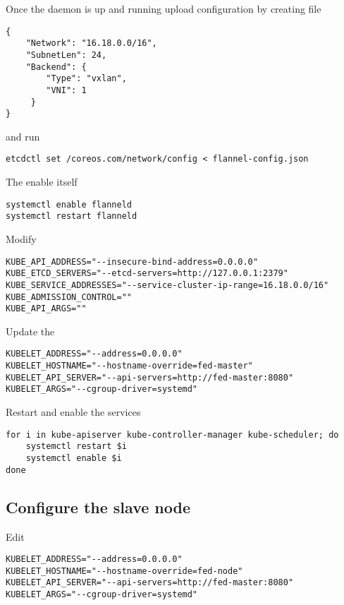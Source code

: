 Once the daemon is up and running upload 
configuration by creating  file

\begin{lstlisting}
{
    "Network": "16.18.0.0/16",
    "SubnetLen": 24,
    "Backend": {
        "Type": "vxlan",
        "VNI": 1
     }
}
\end{lstlisting}

and run

\begin{lstlisting}
etcdctl set /coreos.com/network/config < flannel-config.json
\end{lstlisting}

The enable  itself

\begin{lstlisting}
systemctl enable flanneld
systemctl restart flanneld
\end{lstlisting}

Modify 

\label{kube-service-addresses}
\begin{lstlisting}
KUBE_API_ADDRESS="--insecure-bind-address=0.0.0.0"
KUBE_ETCD_SERVERS="--etcd-servers=http://127.0.0.1:2379"
KUBE_SERVICE_ADDRESSES="--service-cluster-ip-range=16.18.0.0/16"
KUBE_ADMISSION_CONTROL=""
KUBE_API_ARGS=""
\end{lstlisting}

Update the 

\begin{lstlisting}
KUBELET_ADDRESS="--address=0.0.0.0"
KUBELET_HOSTNAME="--hostname-override=fed-master"
KUBELET_API_SERVER="--api-servers=http://fed-master:8080"
KUBELET_ARGS="--cgroup-driver=systemd"
\end{lstlisting}

Restart and enable the services

\begin{lstlisting}
for i in kube-apiserver kube-controller-manager kube-scheduler; do
    systemctl restart $i
    systemctl enable $i
done
\end{lstlisting}

\subsection{Configure the slave node}
\label{subsec:setup-kuber-slave}

Edit 

\begin{lstlisting}
KUBELET_ADDRESS="--address=0.0.0.0"
KUBELET_HOSTNAME="--hostname-override=fed-node"
KUBELET_API_SERVER="--api-servers=http://fed-master:8080"
KUBELET_ARGS="--cgroup-driver=systemd"
\end{lstlisting}

